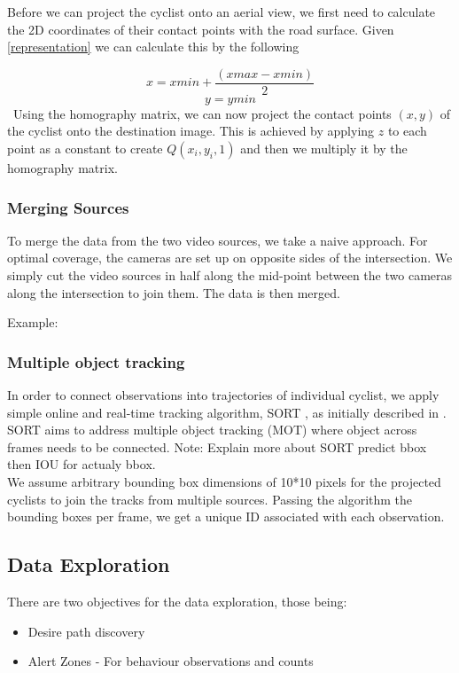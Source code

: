 Before we can project the cyclist onto an aerial view, we first need to calculate the 2D coordinates of their contact points with the road surface.
Given \ref{representation} we can calculate this by the following

$$x = xmin + \frac{(xmax - xmin)}{2}$$
$$y = ymin$$
\
Using the homography matrix, we can now project the contact points $(x, y)$ of the cyclist onto the destination
image. This is achieved by applying $z$ to each point as a constant to create $Q(x_i, y_i, 1)$ and then we multiply it by the homography matrix. 

\subsubsection{Merging Sources}

To merge the data from the two video sources, we take a naive approach. For optimal coverage, the cameras are set up on
opposite sides of the intersection. We simply cut the video sources in half along the mid-point between
the two cameras along the intersection to join them. The data is then merged.

Example:

\subsubsection{Multiple object tracking}

In order to connect observations into trajectories of individual cyclist, we apply 
simple online and real-time tracking algorithm, SORT \cite{abewley_abewley/sort_2021}, as initially described in \cite{Bewley2016_sort}. 
SORT aims to address multiple object tracking (MOT) where object across frames needs to be connected. 
\color{red}
Note: Explain more about SORT predict bbox then IOU for actualy bbox.
\color{black}
\ \\
We assume arbitrary bounding box dimensions of 10*10 pixels for the projected cyclists to join the tracks from multiple sources. 
Passing the algorithm the bounding boxes per frame, we get a unique ID associated with each observation.

\subsection{Data Exploration}

There are two objectives for the data exploration, those being:
\begin{itemize}
	\item Desire path discovery
	\item Alert Zones - For behaviour observations and counts
\end{itemize}

